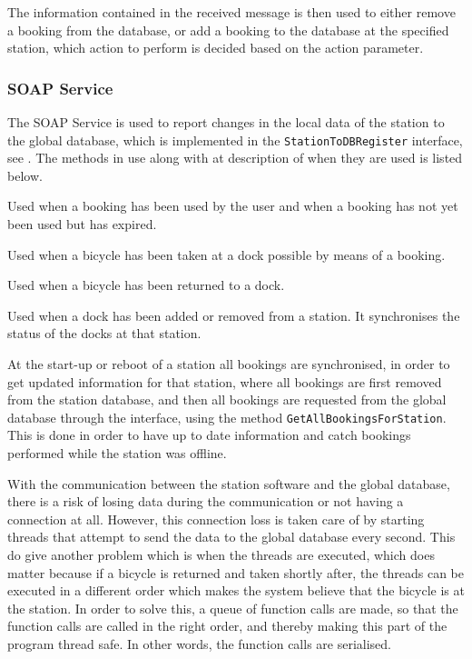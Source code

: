 The information contained in the received message is then used to either remove a booking from the database, or add a booking to the database at the specified station, which action to perform is decided based on the action parameter.

\subsubsection{SOAP Service}
The SOAP Service is used to report changes in the local data of the station to the global database, which is implemented in the \texttt{StationToDBRegister} interface, see .
The methods in use along with at description of when they are used is listed below.

\begin{description}[style=nextline]
\item[BicycleWithBookingUnlocked] Used when a booking has been used by the user and when a booking has not yet been used but has expired.
\item[BicycleTaken] Used when a bicycle has been taken at a dock possible by means of a booking.
\item[BicycleReturnedToDockAtStation] Used when a bicycle has been returned to a dock.
\item[SyncDockStatus] Used when a dock has been added or removed from a station. It synchronises the status of the docks at that station.
\end{description}

At the start-up or reboot of a station all bookings are synchronised, in order to get updated information for that station, where all bookings are first removed from the station database, and then all bookings are requested from the global database through the interface, using the method \texttt{GetAllBookingsForStation}.
This is done in order to have up to date information and catch bookings performed while the station was offline.

With the communication between the station software and the global database, there is a risk of losing data during the communication or not having a connection at all.
However, this connection loss is taken care of by starting threads that attempt to send the data to the global database every second.
This do give another problem which is when the threads are executed, which does matter because if a bicycle is returned and taken shortly after, the threads can be executed in a different order which makes the system believe that the bicycle is at the station. 
In order to solve this, a queue of function calls are made, so that the function calls are called in the right order, and thereby making this part of the program thread safe.
In other words, the function calls are serialised.
